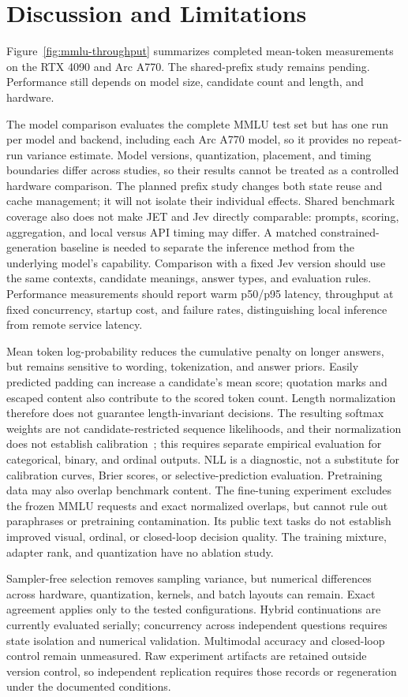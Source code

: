 \section{Discussion and Limitations}
\label{sec:limitations}
Figure~\ref{fig:mmlu-throughput} summarizes completed mean-token measurements
on the RTX 4090 and Arc A770. The shared-prefix study remains pending.
Performance still depends on model size, candidate count and length, and hardware.

The model comparison evaluates the complete MMLU test set but has one run per
model and backend, including each Arc A770 model, so it provides no repeat-run
variance estimate. Model versions,
quantization, placement, and timing boundaries differ across studies, so their
results cannot be treated as a controlled hardware comparison. The planned
prefix study changes both state reuse and cache management; it will not isolate their
individual effects. Shared benchmark coverage also does not make JET and Jev
directly comparable: prompts, scoring, aggregation, and local versus API timing
may differ. A matched constrained-generation baseline is needed to separate the
inference method from the underlying model's capability.
Comparison with a fixed Jev version should use the same contexts, candidate
meanings, answer types, and evaluation rules. Performance measurements should
report warm p50/p95 latency, throughput at fixed concurrency, startup cost,
and failure rates, distinguishing local inference from remote service latency.

Mean token log-probability reduces the cumulative penalty on longer answers,
but remains sensitive to wording, tokenization, and answer priors. Easily
predicted padding can increase a candidate's mean score; quotation marks and
escaped content also contribute to the scored token count. Length normalization
therefore does not guarantee length-invariant decisions. The resulting softmax
weights are not candidate-restricted sequence likelihoods, and their
normalization does not establish calibration~\cite{calibration}; this requires
separate empirical evaluation for categorical, binary, and ordinal outputs.
NLL is a diagnostic, not a substitute for
calibration curves, Brier scores, or selective-prediction evaluation.
Pretraining data may also overlap benchmark content.
The fine-tuning experiment excludes the frozen MMLU requests and exact
normalized overlaps, but cannot rule out paraphrases or pretraining
contamination. Its public text tasks do not establish improved visual,
ordinal, or closed-loop decision quality. The training mixture, adapter rank,
and quantization have no ablation study.

Sampler-free selection removes sampling variance, but numerical differences
across hardware, quantization, kernels, and batch layouts can remain. Exact
agreement applies only to the tested configurations. Hybrid continuations are
currently evaluated serially; concurrency across independent questions requires
state isolation and numerical validation. Multimodal accuracy and closed-loop
control remain unmeasured. Raw experiment artifacts are retained outside version
control, so independent replication requires those records or regeneration under
the documented conditions.

